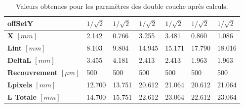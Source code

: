 \begin{table}
\begin{tabular}{|l|l|l|l|l|l|l|}
\textbf{offSetY}                  & $1/\sqrt{2}$          & $1/\sqrt{2}$          & $1/\sqrt{2}$          & $1/\sqrt{2}$          & $1/\sqrt{2}$          & $1/\sqrt{2}$          \\ \hline
\textbf{X $[mm]$}               & 2.142                & 0.766                & 3.255                & 3.481                & 0.860                & 1.086                \\ \hline
\textbf{Lint $[mm]$}            & 8.103                & 9.804                & 14.945               & 15.171               & 17.790               & 18.016               \\ \hline
\textbf{DeltaL $[mm]$}          & 3.455                & 4.181                & 2.413                & 2.413                & 1.963                & 1.963                \\ \hline
\textbf{Recouvrement $[\mu m]$} & 500                  & 500                  & 500                  & 500                  & 500                  & 500                  \\ \hline
\textbf{Lpixels $[mm]$}         & 12.700               & 13.751               & 20.612               & 21.064               & 20.612               & 21.064               \\ \hline
\textbf{L Totale $[mm]$}        & 14.700               & 15.751               & 22.612               & 23.064               & 22.612               & 23.064 \\ \hline             
\end{tabular}
\caption{Valeurs obtenues pour les param\`etres des double couche apr\`es calculs.}
\label{tab:geomResults}
\end{table}

